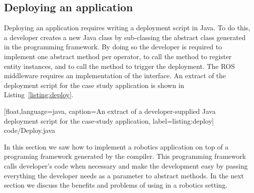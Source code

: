 \subsection{Deploying an application}

Deploying an application requires writing a deployment script in Java.
To do this, a developer creates a new Java class by sub-classing the
abstract class  generated in the programming framework.
By doing so the developer is required to implement one abstract method
per operator, to call the  method to register entity
instances, and to call the  method to trigger the
deployment. The ROS middleware requires an implementation of the
 interface. An extract of the deployment script for the
case study application is shown in Listing~\ref{listing:deploy}.

%
[float,language=java,%
caption={An extract of a developer-supplied Java deployment script for
  the case-study application},%
label={listing:deploy}]%
{code/Deploy.java}


In this section we saw how to implement a robotics application on top
of a programing framework generated by the \diaspec{} compiler. This
programming framework calls developer's code when necessary and make
the development easy by passing everything the developer needs as a
parameter to abstract methods. In the next section we discuss the
benefits and problems of using \diaspec{} in a robotics setting.
